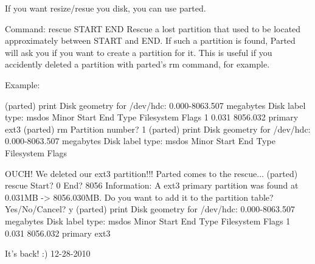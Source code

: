 If you want resize/resue you disk, you can use parted.


 Command: rescue START END
     Rescue a lost partition that used to be located approximately
     between START and END.  If such a partition is found, Parted will
     ask you if you want to create a partition for it.  This is useful
     if you accidently deleted a partition with parted's rm command,
     for example.

     Example:

          (parted) print
          Disk geometry for /dev/hdc: 0.000-8063.507 megabytes
          Disk label type: msdos
          Minor    Start       End     Type      Filesystem  Flags
          1          0.031   8056.032  primary   ext3
          (parted) rm
          Partition number? 1
          (parted) print
          Disk geometry for /dev/hdc: 0.000-8063.507 megabytes
          Disk label type: msdos
          Minor    Start       End     Type      Filesystem  Flags

     OUCH!  We deleted our ext3 partition!!!  Parted comes to the
     rescue...
(parted) rescue
          Start? 0
          End? 8056
          Information: A ext3 primary partition was found at 0.031MB ->
          8056.030MB.  Do you want to add it to the partition table?
          Yes/No/Cancel? y
          (parted) print
          Disk geometry for /dev/hdc: 0.000-8063.507 megabytes
          Disk label type: msdos
          Minor    Start       End     Type      Filesystem  Flags
          1          0.031   8056.032  primary   ext3

     It's back!  :)		12-28-2010
